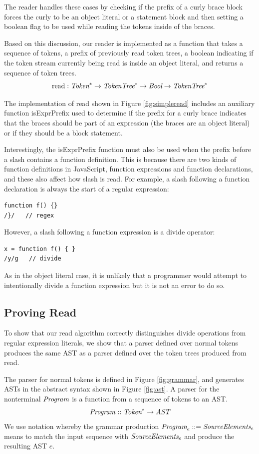 \documentclass[preprint,10pt]{sigplanconf}
\begin{document}
The reader handles these cases by checking if the prefix of a curly
brace block forces the curly to be an object literal or a statement
block and then setting a boolean flag to be used while reading the
tokens inside of the braces.

Based on this discussion, our reader is implemented as
a function that takes a sequence of tokens, a prefix of previously read token trees, a boolean indicating if the token stream currently being read is inside an object literal, and returns a sequence of token trees.
\[
\textrm{read} : \textit{Token}^{*} \rightarrow \textit{TokenTree}^{*} 
\rightarrow \textit{Bool} \rightarrow \textit{TokenTree}^{*}
\]

The implementation of read shown in Figure \ref{fig:simpleread} includes an auxiliary function isExprPrefix used to determine if the prefix for a curly brace indicates that the braces should be part of an expression (\ie the braces are an object literal) or if they should be a block statement.

Interestingly, the isExprPrefix function must also be used when the prefix before a slash contains a function definition. This is because there are two kinds of function definitions in JavaScript, function expressions and function declarations, and these also affect how slash is read. For example, a slash following a function declaration is always the start of a regular expression:
\begin{lstlisting}
function f() {}
/}/   // regex
\end{lstlisting}
However, a slash following a function expression is a divide operator:
\begin{lstlisting}
x = function f() { } 
/y/g   // divide
\end{lstlisting}
As in the object literal case, it is unlikely that a programmer would attempt to intentionally divide a function expression but it is not an error to do so.



\subsection{Proving Read}

To show that our read algorithm correctly distinguishes 
divide operations from regular expression literals, we show that
a parser defined over normal tokens produces the same AST as a parser
defined over the token trees produced from read.

The parser for normal tokens is defined in Figure \ref{fig:grammar},
and generates ASTs in the abstract syntax shown in Figure \ref{fig:ast}. A
parser for the nonterminal \( \textit{Program}_{} \) is a function from a
sequence of tokens to an AST.
\[
\textit{Program}_{} :: \textit{Token}^* \rightarrow \textit{AST}
\]
We use notation whereby the grammar production $\textit{Program}_{e} ::= \textit{SourceElements}_{e}$
means to match the input sequence with $\textit{SourceElements}_{e}$ and
produce the resulting AST $e$.
\end{document}
